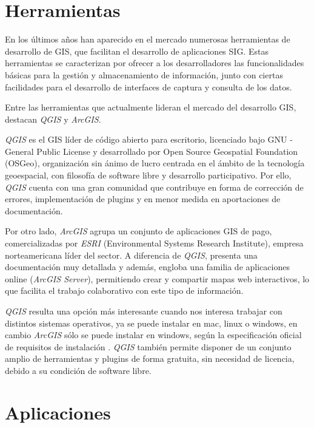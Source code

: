 \section{Herramientas}\label{sec:herramientas}

En los últimos años han aparecido en el mercado numerosas herramientas de desarrollo de GIS, que facilitan el desarrollo de aplicaciones SIG.
Estas herramientas se caracterizan por ofrecer a los desarrolladores las funcionalidades básicas para la gestión y almacenamiento de información,
junto con ciertas facilidades para el desarrollo de interfaces de captura y consulta de los datos.

Entre las herramientas que actualmente lideran el mercado del desarrollo GIS, destacan \textit{QGIS} y \textit{ArcGIS}.

\textit{QGIS} es el GIS líder de código abierto para escritorio, licenciado bajo GNU - General Public License y desarrollado por Open Source Geospatial Foundation (OSGeo), 
organización sin ánimo de lucro centrada en el ámbito de la tecnología geoespacial, con filosofía de software libre y desarrollo participativo.
Por ello, \textit{QGIS} cuenta con una gran comunidad que contribuye en forma de corrección de errores, implementación de plugins y en menor medida en aportaciones de documentación.

Por otro lado, \textit{ArcGIS} agrupa un conjunto de aplicaciones GIS de pago, comercializadas por \textit{ESRI} (Environmental Systems Research Institute), empresa norteamericana líder del sector.
A diferencia de \textit{QGIS}, presenta una documentación muy detallada y además, engloba una familia de aplicaciones online (\textit{ArcGIS Server}), permitiendo crear y compartir mapas web interactivos, lo que facilita el trabajo colaborativo con este tipo de información.

\textit{QGIS} resulta una opción más interesante cuando nos interesa trabajar con distintos sistemas operativos, ya se puede instalar en mac, linux o windows, 
en cambio \textit{ArcGIS} sólo se puede instalar en windows, según la especificación oficial de requisitos de instalación \cite{arcgis-instalation-requirements}.
\textit{QGIS} también permite disponer de un conjunto amplio de herramientas y plugins de forma gratuita, sin necesidad de licencia, debido a su condición de software libre.

\section{Aplicaciones}

